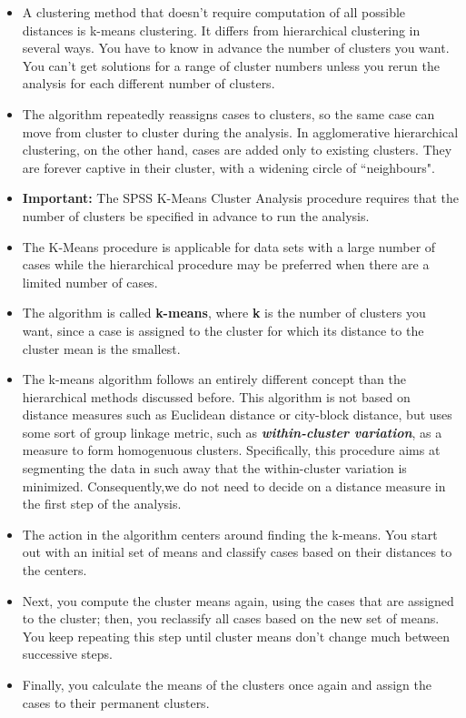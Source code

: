\documentclass[a4paper,12pt]{article}
\begin{document}
\begin{itemize}
\item A clustering method that doesn't require computation of all possible distances is k-means clustering. It differs from hierarchical clustering in several ways. You have to know in advance the number of clusters you want. You can't get solutions for a range of cluster numbers unless you rerun the analysis for each different number of clusters.

\item The algorithm repeatedly reassigns cases to clusters, so the same case can move from cluster to cluster during the analysis. In agglomerative hierarchical clustering, on the other hand, cases are added only to existing clusters. They are forever captive in their cluster, with a widening circle of ``neighbours".

\item \textbf{Important:} The SPSS K-Means Cluster Analysis procedure requires that the number of clusters be specified in advance to run the analysis. 
\item  The K-Means procedure is applicable for data sets with a large number of cases while the hierarchical procedure may be preferred when there are a limited number of cases.


	\item The algorithm is called \textbf{k-means}, where \textbf{k} is the number of clusters you want, since a case is assigned to the cluster for which its distance to the cluster mean is the smallest.
	
	\item The k-means algorithm follows an entirely different concept than the hierarchical methods
	discussed before. This algorithm is not based on distance measures such as
	Euclidean distance or city-block distance, but uses some sort of group linkage metric, such as  \textbf{\textit{within-cluster variation}}, as a measure to form homogenuous clusters. Specifically, this procedure aims at segmenting
	the data in such away that the within-cluster variation is minimized. Consequently,we
	do not need to decide on a distance measure in the first step of the analysis.
	
	\item The action in the algorithm centers around finding the k-means. You start out with an initial set of means and classify cases based on their distances to the centers.
	
	\item Next, you compute the cluster means again, using the cases that are assigned to the cluster; then, you reclassify all cases based on the new set of means. You keep repeating this step until cluster means don't change much between successive steps.
	
	\item Finally, you calculate the means of the clusters once again and assign the cases to their permanent clusters.
\end{itemize}
\end{document}
